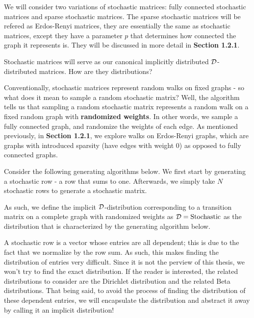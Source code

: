 We will consider two variations of stochastic matrices: fully connected stochastic matrices and sparse stochastic matrices.
The sparse stochastic matrices will be refered as Erdos-Renyi matrices, they are essentially the same as stochastic matrices, except they have a parameter $p$ that
determines how connected the graph it represents is. They will be discussed in more detail in \textbf{Section 1.2.1}.


Stochastic matrices will serve as our canonical implicitly distributed $\mathcal{D}$-distributed matrices. How are they distributions?

Conventionally, stochastic matrices represent random walks on fixed graphs - so what does it mean to sample a random stochastic matrix?
Well, the algorithm tells us that sampling a random stochastic matrix represents a random walk on a fixed random graph with \textbf{randomized weights}.
In other words, we sample a fully connected graph, and randomize the weights of each edge. As mentioned previously, in \textbf{Section 1.2.1}, we explore walks on Erdos-Renyi graphs,
which are graphs with introduced sparsity (have edges with weight 0) as opposed to fully connected graphs.

Consider the following generating algorithms below. We first start by generating a stochastic row - a row that sums to one. Afterwards, we simply take $N$ stochastic rows to generate a stochastic matrix.

\ALGstochrow

As such, we define the implicit $\mathcal{D}$-distribution corresponding to a transition matrix on a complete graph with randomized weights as $\mathcal{D} = \text{Stochastic}$ as the distribution that
is characterized by the generating algorithm below.

\ALGstoch

\begin{remark}
A stochastic row is a vector whose entries are all dependent; this is due to the fact that we normalize by the row sum.
As such, this makes finding the distribution of entries very difficult. Since it is not the perview of this thesis, we won't try to find the exact distribution.
If the reader is interested, the related distributions to consider are the Dirichlet distribution and the related Beta distributions.
That being said, to avoid the process of finding the distribution of these dependent entries, we will encapsulate the distribution and abstract it away by calling it an implicit distribution!
\end{remark}

